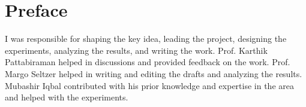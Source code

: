 
\chapter{Preface}

I was responsible for shaping the key idea, leading the project, designing the experiments, analyzing the results, and writing the work.
Prof. Karthik Pattabiraman helped in discussions and provided feedback on the work.
Prof. Margo Seltzer helped in writing and editing the drafts and analyzing the results. 
Mubashir Iqbal contributed with his prior knowledge and expertise in the area and helped with the experiments.
